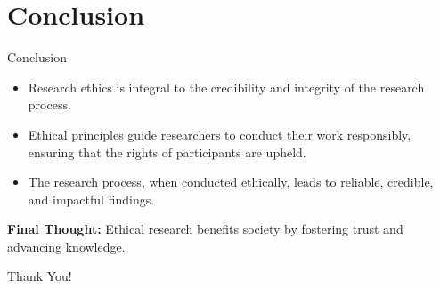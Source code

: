 \documentclass{beamer}
\begin{document}
	\section{Conclusion}
	\begin{frame}{Conclusion}
		\begin{itemize}
			\item Research ethics is integral to the credibility and integrity of the research process.
			\item Ethical principles guide researchers to conduct their work responsibly, ensuring that the rights of participants are upheld.
			\item The research process, when conducted ethically, leads to reliable, credible, and impactful findings.
		\end{itemize}
		\vspace{0.5cm}
		\textbf{Final Thought:} Ethical research benefits society by fostering trust and advancing knowledge.
	\end{frame}
	
	\begin{frame}
		\begin{center}
			\Huge{Thank You!}
		\end{center}
	\end{frame}
	
\end{document}
